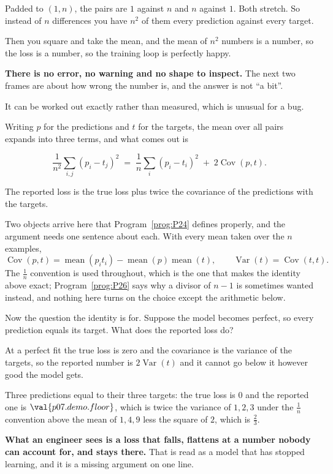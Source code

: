 \begin{fr}
Padded to $(1, n)$, the pairs are $1$ against $n$ and $n$ against $1$. Both
stretch. So instead of $n$ differences you have $n^{2}$ of them \dash{} every
prediction against every target.

Then you square and take the mean, and the mean of $n^{2}$ numbers is a number,
so the loss is a number, so the training loop is perfectly happy.

\textbf{There is no error, no warning and no shape to inspect.} The next two
frames are about how wrong the number is, and the answer is not
\enquote{a bit}.
\end{fr}

\begin{fr}
It can be worked out exactly rather than measured, which is unusual for a bug.

Writing $p$ for the predictions and $t$ for the targets, the mean over all
pairs expands into three terms, and what comes out is

\[ \frac{1}{n^{2}}\sum_{i,j} (p_i - t_j)^{2}
   \;=\; \frac{1}{n}\sum_{i} (p_i - t_i)^{2} \;+\; 2\operatorname{Cov}(p, t). \]

The reported loss is the true loss plus twice the covariance of the predictions
with the targets.

\begin{rigourbox}
Two objects arrive here that Program~\ref{prog:P24} defines properly, and the
argument needs one sentence about each. With every mean taken over the $n$
examples,
\[ \operatorname{Cov}(p, t)
   = \operatorname{mean}(p_i t_i)
     - \operatorname{mean}(p)\operatorname{mean}(t),
   \qquad \operatorname{Var}(t) = \operatorname{Cov}(t, t). \]
The $\frac{1}{n}$ convention is used throughout, which is the one that makes the
identity above exact; Program~\ref{prog:P26} says why a divisor of $n - 1$ is
sometimes wanted instead, and nothing here turns on the choice except the
arithmetic below.
\end{rigourbox}

Now the question the identity is for. Suppose the model becomes perfect, so
every prediction equals its target. What does the reported loss do?
\dotline
\nextframe
\end{fr}

\begin{fr}
At a perfect fit the true loss is zero and the covariance is the variance of
the targets, so the reported number is $2\operatorname{Var}(t)$ and it cannot
go below it however good the model gets.


Three predictions equal to their three targets: the true loss is $0$ and the
reported one is $\val{p07.demo.floor}$, which is twice the variance of
$1, 2, 3$ under the $\frac{1}{n}$ convention above \dash{} the mean of
$1, 4, 9$ less the square of $2$, which is $\frac{2}{3}$.

\textbf{What an engineer sees is a loss that falls, flattens at a number nobody
can account for, and stays there.} That is read as a model that has stopped
learning, and it is a missing argument on one line.
\end{fr}

